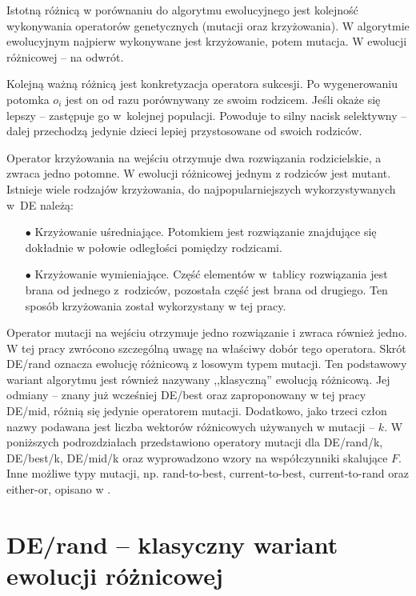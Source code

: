 \documentclass[a4paper,onecolumn,oneside,12pt,wide,floatssmall]{mwrep}
\theoremstyle{definition}
\theoremstyle{plain}%
\theoremstyle{remark}
\begin{document}
Istotną różnicą w porównaniu do algorytmu ewolucyjnego jest kolejność wykonywania operatorów
genetycznych (mutacji oraz krzyżowania).
W algorytmie ewolucyjnym najpierw wykonywane jest krzyżowanie, potem mutacja.
W ewolucji różnicowej -- na odwrót.

Kolejną ważną różnicą jest konkretyzacja operatora sukcesji. Po wygenerowaniu potomka
$o_i$ jest on od razu porównywany ze swoim rodzicem. Jeśli okaże się lepszy -- zastępuje go
w~kolejnej populacji. Powoduje to silny nacisk selektywny -- dalej przechodzą jedynie dzieci
lepiej przystosowane od swoich rodziców.

Operator krzyżowania na wejściu otrzymuje dwa rozwiązania rodzicielskie, a zwraca jedno potomne. 
W ewolucji różnicowej jednym z rodziców jest mutant. Istnieje wiele rodzajów krzyżowania, do najpopularniejszych 
wykorzystywanych w DE należą:
\begin{itemize} 
 \item[$\bullet$] Krzyżowanie uśredniające. 
Potomkiem jest rozwiązanie znajdujące się dokładnie w połowie odległości pomiędzy rodzicami.
 \item[$\bullet$]  Krzyżowanie wymieniające. 
Część elementów w tablicy rozwiązania jest brana od jednego z rodziców, 
pozostała część jest brana od drugiego. Ten sposób krzyżowania został wykorzystany w tej pracy.
\end{itemize} 

Operator mutacji na wejściu otrzymuje jedno rozwiązanie i zwraca również jedno.
W tej pracy zwrócono szczególną uwagę na właściwy dobór tego operatora.
Skrót DE/rand oznacza ewolucję różnicową z losowym typem mutacji.
Ten podstawowy wariant algorytmu jest również nazywany ,,klasyczną'' ewolucją różnicową. 
Jej odmiany -- znany już wcześniej DE/best oraz zaproponowany w tej pracy DE/mid, 
różnią się jedynie operatorem mutacji.
Dodatkowo, jako trzeci człon nazwy podawana jest liczba wektorów różnicowych używanych w mutacji -- $k$.
W poniższych podrozdziałach przedstawiono operatory mutacji dla DE/rand/k, DE/best/k, DE/mid/k 
oraz wyprowadzono wzory na współczynniki skalujące $F$.
Inne możliwe typy mutacji, np. rand-to-best, current-to-best, current-to-rand oraz either-or, 
opisano w \cite{zaharie}.

\section{DE/rand -- klasyczny wariant ewolucji różnicowej}
\label{chap:de_rand} 
\end{document}
